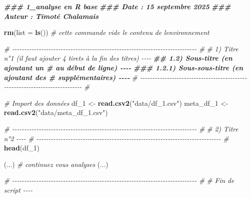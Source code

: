 \documentclass[
]{book}
\newenvironment{Shaded}{\begin{snugshade}}{\end{snugshade}}
\newcommand{\AttributeTok}[1]{\textcolor[rgb]{0.13,0.29,0.53}{#1}}
\newcommand{\CommentTok}[1]{\textcolor[rgb]{0.56,0.35,0.01}{\textit{#1}}}
\newcommand{\DocumentationTok}[1]{\textcolor[rgb]{0.56,0.35,0.01}{\textbf{\textit{#1}}}}
\newcommand{\FunctionTok}[1]{\textcolor[rgb]{0.13,0.29,0.53}{\textbf{#1}}}
\newcommand{\NormalTok}[1]{#1}
\newcommand{\OtherTok}[1]{\textcolor[rgb]{0.56,0.35,0.01}{#1}}
\newcommand{\StringTok}[1]{\textcolor[rgb]{0.31,0.60,0.02}{#1}}
\begin{document}
\begin{Shaded}
\begin{Highlighting}[]
\DocumentationTok{\#\#\# 1\_analyse en R base}
\DocumentationTok{\#\#\# Date : 15 septembre 2025 }
\DocumentationTok{\#\#\# Auteur : Timoté Chalamais}

\FunctionTok{rm}\NormalTok{(}\AttributeTok{list =} \FunctionTok{ls}\NormalTok{()) }\CommentTok{\# cette commande vide le contenu de l\textquotesingle{}environnement}

\CommentTok{\# {-}{-}{-}{-}{-}{-}{-}{-}{-}{-}{-}{-}{-}{-}{-}{-}{-}{-}{-}{-}{-}{-}{-}{-}{-}{-}{-}{-}{-}{-}{-}{-}{-}{-}{-}{-}{-}{-}{-}{-}{-}{-}{-}{-}{-}{-}{-}{-}{-}{-}{-}{-}{-}{-}{-}{-}{-}{-}{-}{-}{-}{-}{-}{-}{-}{-}{-}{-}{-}{-}{-}{-}{-}{-}{-}{-} \#}
\CommentTok{\# 1) Titre n°1 (il faut ajouter 4 tirets à la fin des titres) {-}{-}{-}{-}}
\DocumentationTok{\#\# 1.2) Sous{-}titre (en ajoutant un \# au début de ligne) {-}{-}{-}{-}}
\DocumentationTok{\#\#\# 1.2.1) Sous{-}sous{-}titre (en ajoutant des \# supplémentaires) {-}{-}{-}{-} }
\CommentTok{\# {-}{-}{-}{-}{-}{-}{-}{-}{-}{-}{-}{-}{-}{-}{-}{-}{-}{-}{-}{-}{-}{-}{-}{-}{-}{-}{-}{-}{-}{-}{-}{-}{-}{-}{-}{-}{-}{-}{-}{-}{-}{-}{-}{-}{-}{-}{-}{-}{-}{-}{-}{-}{-}{-}{-}{-}{-}{-}{-}{-}{-}{-}{-}{-}{-}{-}{-}{-}{-}{-}{-}{-}{-}{-}{-}{-} \#}

\CommentTok{\# Import des données}
\NormalTok{df\_1 }\OtherTok{\textless{}{-}} \FunctionTok{read.csv2}\NormalTok{(}\StringTok{"data/df\_1.csv"}\NormalTok{)}
\NormalTok{meta\_df\_1 }\OtherTok{\textless{}{-}} \FunctionTok{read.csv2}\NormalTok{(}\StringTok{"data/meta\_df\_1.csv"}\NormalTok{)}

\CommentTok{\# {-}{-}{-}{-}{-}{-}{-}{-}{-}{-}{-}{-}{-}{-}{-}{-}{-}{-}{-}{-}{-}{-}{-}{-}{-}{-}{-}{-}{-}{-}{-}{-}{-}{-}{-}{-}{-}{-}{-}{-}{-}{-}{-}{-}{-}{-}{-}{-}{-}{-}{-}{-}{-}{-}{-}{-}{-}{-}{-}{-}{-}{-}{-}{-}{-}{-}{-}{-}{-}{-}{-}{-}{-}{-}{-}{-} \#}
\CommentTok{\# 2) Titre n°2  {-}{-}{-}{-}}
\CommentTok{\# {-}{-}{-}{-}{-}{-}{-}{-}{-}{-}{-}{-}{-}{-}{-}{-}{-}{-}{-}{-}{-}{-}{-}{-}{-}{-}{-}{-}{-}{-}{-}{-}{-}{-}{-}{-}{-}{-}{-}{-}{-}{-}{-}{-}{-}{-}{-}{-}{-}{-}{-}{-}{-}{-}{-}{-}{-}{-}{-}{-}{-}{-}{-}{-}{-}{-}{-}{-}{-}{-}{-}{-}{-}{-}{-}{-} \#}
\FunctionTok{head}\NormalTok{(df\_1)}

\NormalTok{(...) }\CommentTok{\# continuez vous analyses}
\NormalTok{(...)}

\CommentTok{\# {-}{-}{-}{-}{-}{-}{-}{-}{-}{-}{-}{-}{-}{-}{-}{-}{-}{-}{-}{-}{-}{-}{-}{-}{-}{-}{-}{-}{-}{-}{-}{-}{-}{-}{-}{-}{-}{-}{-}{-}{-}{-}{-}{-}{-}{-}{-}{-}{-}{-}{-}{-}{-}{-}{-}{-}{-}{-}{-}{-}{-}{-}{-}{-}{-}{-}{-}{-}{-}{-}{-}{-}{-}{-}{-}{-} \#}
\CommentTok{\# Fin de script  {-}{-}{-}{-}}


\end{Highlighting}
\end{Shaded}
\end{document}
